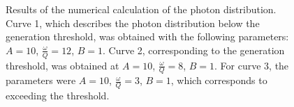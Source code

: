 \begin{figure}
\centering

\caption{Results of the numerical calculation of the photon distribution. Curve
  1, which describes the photon distribution below the generation threshold,
  was obtained with the following parameters: $A = 10$, $\frac{\omega}{Q} = 12$,
  $B = 1$. Curve 2, corresponding to the generation threshold, was obtained at $A = 10$, $\frac{\omega}{Q} = 8$,
  $B = 1$. For curve 3, the parameters were $A = 10$, $\frac{\omega}{Q} = 3$,
  $B = 1$, which corresponds to exceeding the threshold.}
\label{figPart2Ch1_4}
\end{figure}